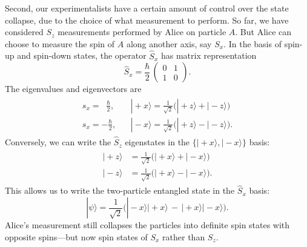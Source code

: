 \documentclass[pra,12pt]{revtex4}
\begin{document}
Second, our experimentalists have a certain amount of control over the
state collapse, due to the choice of what measurement to perform.  So
far, we have considered $S_z$ measurements performed by Alice on
particle $A$.  But Alice can choose to measure the spin of $A$ along
another axis, say $S_x$.  In the basis of spin-up and spin-down
states, the operator $\hat{S}_x$ has matrix representation
\begin{equation}
  \hat{S}_x = \frac{\hbar}{2}\, \begin{pmatrix}0&1\\1&0\end{pmatrix}.
  \end{equation}
The eigenvalues and eigenvectors are
\begin{align}
  \begin{aligned}s_x = \;\;\frac{\hbar}{2},\; &\;\;\; |\!+\!x\rangle = \frac{1}{\sqrt{2}}\Big(|\!+\!z\rangle + |\!-\!z\rangle\Big) \\ s_x = -\frac{\hbar}{2}, &\;\;\; |\!-\!x\rangle = \frac{1}{\sqrt{2}}\Big(|\!+\!z\rangle - |\!-\!z\rangle\Big).\end{aligned}
\end{align}
Conversely, we can write the $\hat{S}_z$ eigenstates in the $\{|\!+\!x\rangle,|\!-\!x\rangle\}$ basis:
\begin{align}
  \begin{aligned}|\!+\!z\rangle &= \frac{1}{\sqrt{2}}\Big(|\!+\!x\rangle + |\!-\!x\rangle\Big) \\ |\!-\!z\rangle &= \frac{1}{\sqrt{2}}\Big(|\!+\!x\rangle - |\!-\!x\rangle\Big).\end{aligned}
\end{align}
This allows us to write the two-particle entangled state in the
$\hat{S}_x$ basis:
\begin{equation}
  |\psi\rangle = \frac{1}{\sqrt{2}} \Big(|\!-\!x\rangle|\!+\!x\rangle \,-\, |\!+\!x\rangle|\!-\!x\rangle\Big).
\end{equation}
Alice's measurement still collapses the particles into definite spin
states with opposite spins---but now spin states of ${S}_x$ rather
than ${S}_z$.
\end{document}

